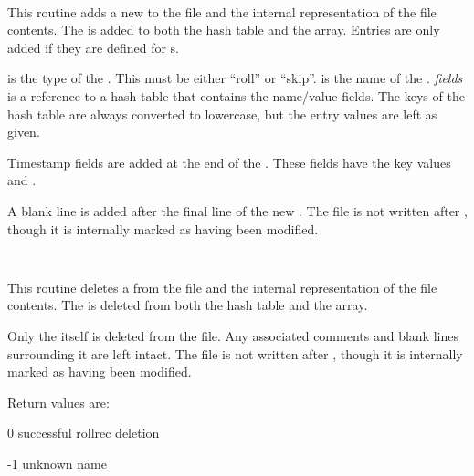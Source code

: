 \begin{description}

\item {}\verb" "

This routine adds a new  to the  file and the
internal representation of the file contents.  The  is added
to both the  hash table and the \var{\@rollreclines} array.
Entries are only added if they are defined for s.

 is the type of the .  This must be either
``roll'' or ``skip''.   is the name of the .
{\it fields} is a reference to a hash table that contains the name/value
 fields.  The keys of the hash table are always converted to
lowercase, but the entry values are left as given.

Timestamp fields are added at the end of the .  These fields
have the key values  and .

A blank line is added after the final line of the new .  The
 file is not written after , though it is
internally marked as having been modified.

\item {}\verb" "

This routine deletes a  from the  file and the
internal representation of the file contents.  The  is deleted
from both the  hash table and the \var{\@rollreclines} array.

Only the  itself is deleted from the file.  Any associated
comments and blank lines surrounding it are left intact.  The 
file is not written after , though it is internally
marked as having been modified.

Return values are:

\begin{description}
\item 0 successful rollrec deletion
\item -1 unknown name
\end{description}

\item {}\verb" "


\end{description}
